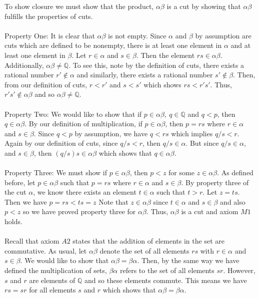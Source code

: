 \documentclass[12pt]{article}
\begin{document}
To show closure we must show that the product, $\alpha \beta$ is a cut by showing that $\alpha \beta$ fulfills the properties of cuts. \\ \\ 
Property One: It is clear that $\alpha \beta$ is not empty. Since $\alpha$ and $\beta$ by assumption are cuts which are defined to be nonempty, there is at least one element in $\alpha$ and at least one element in $\beta$. Let $r \in \alpha$ and $s \in \beta$. Then the element $rs \in \alpha \beta$. \\
Additionally, $\alpha \beta \neq \mathbb{Q}$. To see this, note by the definition of cuts, there exists a rational number $r' \notin \alpha$ and similarly, there exists a rational number $s' \notin \beta$. Then, from our definition of cuts, $r<r'$ and $s<s'$ which shows $rs<r's'$. Thus, $r's' \notin \alpha \beta$ and so $\alpha \beta \neq \mathbb{Q}$.  \\ \\
Property Two: We would like to show that if $p \in \alpha \beta,~q \in \mathbb{Q}$ and $q<p$, then $q \in \alpha \beta$. By our definition of multiplication, if $p \in \alpha \beta$, then $p=rs$ where $r \in \alpha$ and $s \in \beta$. Since $q<p$ by assumption, we have $q<rs$ which implies $q/s<r$. Again by our definition of cuts, since $q/s<r$, then $q/s \in \alpha$. But since $q/s \in \alpha$, and $s \in \beta$, then $(q/s)s \in \alpha \beta$ which shows that $q \in \alpha \beta$. \\ \\ 
Property Three: We must show if $p \in \alpha \beta$, then $p<z$ for some $z \in \alpha \beta$. As defined before, let $p \in \alpha \beta$ such that $p=rs$ where $r \in \alpha$ and $s \in \beta$. By property three of the cut $\alpha$, we know there exists an element $t \in \alpha$ such that $t>r$. Let $z=ts$. Then we have $p=rs < ts = z$ Note that $z \in \alpha \beta$ since $t \in \alpha$ and $s \in \beta$ and also $p<z$ so we have proved property three for $\alpha \beta$.  Thus, $\alpha \beta$ is a cut and axiom $M1$ holds. \\ \\

Recall that axiom $A2$ states that the addition of elements in the set are commutative. As usual, let $\alpha \beta$ denote the set of all elements $rs$ with $r \in \alpha$ and $s \in \beta$. We would like to show that $\alpha \beta = \beta \alpha$. Then, by the same way we have defined the multiplication of sets, $\beta \alpha$ refers to the set of all elements $sr$. However, $s$ and $r$ are elements of $\mathbb{Q}$ and so these elements commute. This means we have $rs=sr$ for all elements $s$ and $r$ which shows that $\alpha \beta = \beta \alpha$. \\ \\
\end{document}
